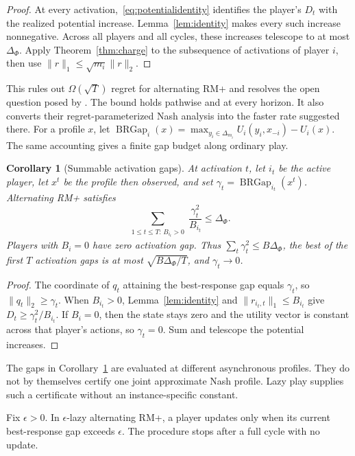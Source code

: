 \documentclass{article}
\newtheorem{corollary}[theorem]{Corollary}
\newcommand{\BRGap}{\operatorname{BRGap}}
\begin{document}
\begin{proof}
At every activation,~\eqref{eq:potentialidentity} identifies the player's $D_t$ with the realized potential increase. Lemma~\ref{lem:identity} makes every such increase nonnegative. Across all players and all cycles, these increases telescope to at most $\Delta_\Phi$. Apply Theorem~\ref{thm:charge} to the subsequence of activations of player $i$, then use $\|r\|_1\le\sqrt{m_i}\|r\|_2$.
\end{proof}

This rules out $\Omega(\sqrt T)$ regret for alternating RM+ and resolves the open question posed by \citet{Anagnostides26:Convergence}. The bound holds pathwise and at every horizon. It also converts their regret-parameterized Nash analysis into the faster rate suggested there. For a profile $x$, let $\BRGap_i(x)=\max_{y_i\in\Delta_{m_i}}U_i(y_i,x_{-i})-U_i(x)$. The same accounting gives a finite gap budget along ordinary play.

\begin{corollary}[Summable activation gaps]
\label{cor:activation}
At activation $t$, let $i_t$ be the active player, let $x^t$ be the profile then observed, and set $\gamma_t=\BRGap_{i_t}(x^t)$. Alternating RM+ satisfies
\begin{equation}
\sum_{\substack{1\le t\le T:\,B_{i_t}>0}}\frac{\gamma_t^2}{B_{i_t}}\le\Delta_\Phi.
\label{eq:activation}
\end{equation}
Players with $B_i=0$ have zero activation gap. Thus $\sum_t\gamma_t^2\le B\Delta_\Phi$, the best of the first $T$ activation gaps is at most $\sqrt{B\Delta_\Phi/T}$, and $\gamma_t\to0$.
\end{corollary}

\begin{proof}
The coordinate of $q_t$ attaining the best-response gap equals $\gamma_t$, so $\|q_t\|_2\ge\gamma_t$. When $B_{i_t}>0$, Lemma~\ref{lem:identity} and $\|r_{i_t,t}\|_1\le B_{i_t}$ give $D_t\ge\gamma_t^2/B_{i_t}$. If $B_i=0$, then the state stays zero and the utility vector is constant across that player's actions, so $\gamma_t=0$. Sum and telescope the potential increases.
\end{proof}

The gaps in Corollary~\ref{cor:activation} are evaluated at different asynchronous profiles. They do not by themselves certify one joint approximate Nash profile. Lazy play supplies such a certificate without an instance-specific constant.

Fix $\epsilon>0$. In $\epsilon$-lazy alternating RM+, a player updates only when its current best-response gap exceeds $\epsilon$. The procedure stops after a full cycle with no update.
\end{document}

